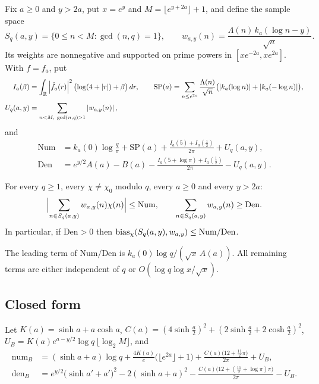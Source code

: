 Fix $a\ge0$ and $y>2a$, put $x=e^y$ and $M=\lfloor e^{y+2a}\rfloor+1$, and define the sample space
\[
  S_q(a,y)=\{0\le n<M:\gcd(n,q)=1\},\qquad w_{a,y}(n)=\frac{\Lambda(n)\,k_a(\log n-y)}{\sqrt n}.
\]
Its weights are nonnegative and supported on prime powers in $[xe^{-2a},xe^{2a}]$. With $f=f_a$, put
\begin{align*}
  I_a(\beta)&=\int_{\mathbb{R}}\left\lvert \hat f_a(r) \right\rvert^2\bigl(\log(4+\left\lvert r \right\rvert)+\beta\bigr)\,dr,\qquad
  \mathrm{SP}(a)=\sum_{n\le e^{2a}}\frac{\Lambda(n)}{\sqrt n}\bigl(\left\lvert k_a(\log n) \right\rvert+\left\lvert k_a(-\log n) \right\rvert\bigr),\\
  U_q(a,y)&=\sum_{n<M,\ \gcd(n,q)>1}\left\lvert w_{a,y}(n) \right\rvert ,
\end{align*}
and
\begin{align*}
  \mathrm{Num}&=k_a(0)\log\tfrac q\pi+\mathrm{SP}(a)+\frac{I_a(5)+I_a(\frac12)}{2\pi}+U_q(a,y),\\
  \mathrm{Den}&=e^{y/2}A(a)-B(a)-\frac{I_a(5+\log\pi)+I_a(\frac12)}{2\pi}-U_q(a,y).
\end{align*}

\begin{theorem}\label{thm:sharp}
For every $q\ge1$, every $\chi\ne\chi_0$ modulo $q$, every $a\ge0$ and every $y>2a$:
\[
  \Bigl\lvert\sum_{n\in S_q(a,y)}w_{a,y}(n)\chi(n)\Bigr\rvert\le\mathrm{Num},\qquad
  \sum_{n\in S_q(a,y)}w_{a,y}(n)\ge\mathrm{Den}.
\]
In particular, if $\mathrm{Den}>0$ then $\operatorname{bias}_\chi(S_q(a,y),w_{a,y})\le\mathrm{Num}/\mathrm{Den}$.
\end{theorem}

The leading term of $\mathrm{Num}/\mathrm{Den}$ is $k_a(0)\log q/(\sqrt x\,A(a))$. All remaining terms are
either independent of $q$ or $O(\log q\log x/\sqrt x)$.

\subsection{Closed form}
Let $K(a)=\sinh a+a\cosh a$, $C(a)=(4\sinh\frac a2)^2+(2\sinh\frac a2+2\cosh\frac a2)^2$,
$U_B=K(a)e^{a-y/2}\log q\,\lfloor\log_2M\rfloor$, and
\begin{align*}
  \mathrm{num}_B&=(\sinh a+a)\log q+\frac{4K(a)}{e}\bigl(\lfloor e^{2a}\rfloor+1\bigr)
     +\frac{C(a)\bigl(12+\frac{11}2\pi\bigr)}{2\pi}+U_B,\\
  \mathrm{den}_B&=e^{y/2}\bigl(\sinh a'+a'\bigr)^2-2(\sinh a+a)^2-\frac{C(a)\bigl(12+(\frac{11}2+\log\pi)\pi\bigr)}{2\pi}-U_B .
\end{align*}

